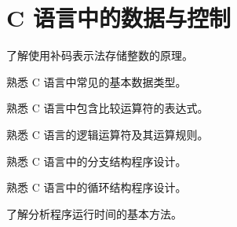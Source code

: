 
\chapter{C 语言中的数据与控制}

\begin{introduction}
	\item 了解使用补码表示法存储整数的原理。
	\item 熟悉 C 语言中常见的基本数据类型。
	\item 熟悉 C 语言中包含比较运算符的表达式。
	\item 熟悉 C 语言的逻辑运算符及其运算规则。
	\item 熟悉 C 语言中的分支结构程序设计。
	\item 熟悉 C 语言中的循环结构程序设计。
	\item 了解分析程序运行时间的基本方法。
\end{introduction}
